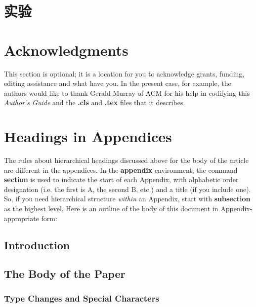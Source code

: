 \documentclass{acm_proc_article-sp}
\begin{document}
\section{实验}

\section{Acknowledgments}
This section is optional; it is a location for you
to acknowledge grants, funding, editing assistance and
what have you.  In the present case, for example, the
authors would like to thank Gerald Murray of ACM for
his help in codifying this \textit{Author's Guide}
and the \textbf{.cls} and \textbf{.tex} files that it describes.

%


\cite{张明亮2012五子棋机器博弈系统评估函数的设计}
\cite{裴博文2008五子棋人工智能权重估值算法}
\cite{cnblogs1}
\cite{cnblogs2}
\cite{xqbase1}
\cite{xqbase2}
\cite{xqbase3}
%
%
\appendix
\section{Headings in Appendices}
The rules about hierarchical headings discussed above for
the body of the article are different in the appendices.
In the \textbf{appendix} environment, the command
\textbf{section} is used to
indicate the start of each Appendix, with alphabetic order
designation (i.e. the first is A, the second B, etc.) and
a title (if you include one).  So, if you need
hierarchical structure
\textit{within} an Appendix, start with \textbf{subsection} as the
highest level. Here is an outline of the body of this
document in Appendix-appropriate form:
\subsection{Introduction}
\subsection{The Body of the Paper}
\subsubsection{Type Changes and  Special Characters}
\end{document}
